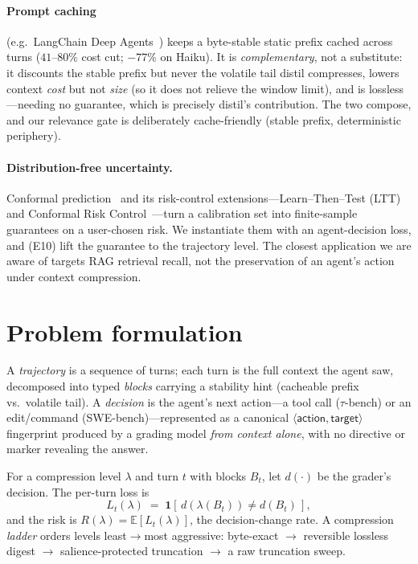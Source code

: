 \documentclass{article}
\begin{document}
\paragraph{Prompt caching} (e.g.\ LangChain Deep Agents~\cite{deepagents}) keeps a byte-stable
static prefix cached across turns ($41$--$80\%$ cost cut; $-77\%$ on Haiku). It is
\emph{complementary}, not a substitute: it discounts the stable prefix but never the volatile
tail distil compresses, lowers context \emph{cost} but not \emph{size} (so it does not relieve
the window limit), and is lossless---needing no guarantee, which is precisely distil's
contribution. The two compose, and our relevance gate is deliberately cache-friendly (stable
prefix, deterministic periphery).
\paragraph{Distribution-free uncertainty.} Conformal prediction~\cite{vovk} and its
risk-control extensions---Learn--Then--Test (LTT)~\cite{ltt} and Conformal Risk
Control~\cite{crc}---turn a calibration set into finite-sample guarantees on a
user-chosen risk. We instantiate them with an agent-decision loss, and (E10) lift the
guarantee to the trajectory level. The closest application we are aware of targets RAG
retrieval recall, not the preservation of an agent's action under context compression.

\section{Problem formulation}
\label{sec:problem}
A \emph{trajectory} is a sequence of turns; each turn is the full context the agent
saw, decomposed into typed \emph{blocks} carrying a stability hint (cacheable prefix
vs.\ volatile tail). A \emph{decision} is the agent's next action---a tool call
($\tau$-bench) or an edit/command (SWE-bench)---represented as a canonical
$\langle\textsf{action},\textsf{target}\rangle$ fingerprint produced by a grading
model \emph{from context alone}, with no directive or marker revealing the answer.

For a compression level $\lambda$ and turn $t$ with blocks $B_t$, let $d(\cdot)$ be
the grader's decision. The per-turn loss is
\[
  L_t(\lambda) \;=\; \mathbf{1}\!\left[\, d(\lambda(B_t)) \neq d(B_t) \,\right],
\]
and the risk is $R(\lambda)=\mathbb{E}[L_t(\lambda)]$, the decision-change rate. A
compression \emph{ladder} orders levels least$\to$most aggressive: byte-exact
$\to$ reversible lossless digest $\to$ salience-protected truncation $\to$ a raw
truncation sweep.
\end{document}
